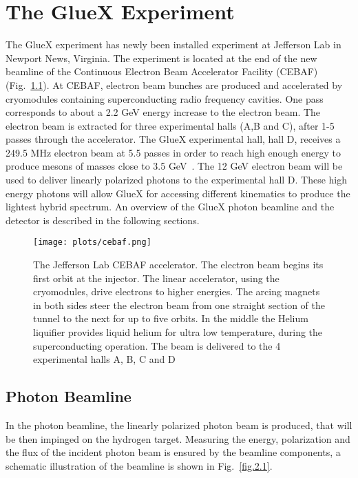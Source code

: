 \chapter{The GlueX Experiment}
\label{p.2}

The GlueX experiment has newly been installed experiment at Jefferson Lab in Newport News, Virginia. The experiment is located at the end of the new beamline of the Continuous Electron Beam Accelerator Facility (CEBAF) (Fig.~\ref{fig.2}). At CEBAF, electron beam bunches are produced and accelerated by cryomodules containing superconducting radio frequency cavities. One pass corresponds to about a 2.2 GeV energy increase to the electron beam. The electron beam is extracted for three experimental halls (A,B and C), after 1-5 passes through the accelerator. The GlueX experimental hall, hall D, receives a 249.5 MHz electron beam at 5.5 passes in order to reach high enough energy to produce mesons of masses close to 3.5 GeV~\cite{30}. The 12 GeV electron beam will be used to deliver linearly polarized photons to the experimental hall D. These high energy photons will allow GlueX for accessing different kinematics to produce the lightest hybrid spectrum. An overview of the GlueX photon beamline and the detector is described in the following sections.

\begin{figure}[H]
    \centering
        \texttt{[image: plots/cebaf.png]}
        \caption{The Jefferson Lab CEBAF accelerator. The electron beam begins its first orbit at the injector. The linear accelerator, using the cryomodules, drive electrons to higher energies. The arcing magnets in both sides steer the electron beam from one straight section of the tunnel to the next for up to five orbits. In the middle the Helium liquifier provides liquid helium for ultra low temperature, during the superconducting operation. The beam is delivered to the 4 experimental halls A, B, C and D~\cite{30}}
        \label{fig.2}
\end{figure}

\section{Photon Beamline}
\label{p.2.1}

In the photon beamline, the linearly polarized photon beam is produced, that will be then impinged on the hydrogen target. Measuring the energy, polarization and the flux of the incident photon beam is ensured by the beamline components, a schematic illustration of the beamline is shown in Fig.~\ref{fig.2.1}.


